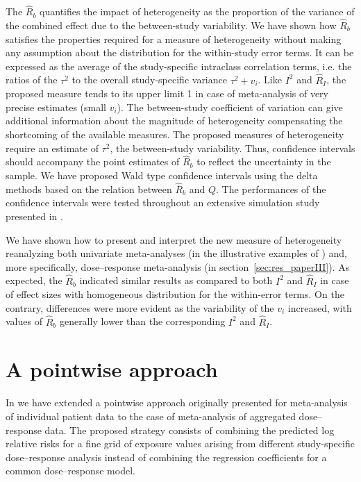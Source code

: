 \documentclass[11pt,a4paper,twoside,openany]{book}\usepackage{knitr}
\begin{document}
{The $\hat R_b$ quantifies the impact of heterogeneity as the proportion of the variance of the combined effect due to the between-study variability. We have shown how $\hat R_b$ satisfies the properties required for a measure of heterogeneity without making any assumption about the distribution for the within-study error terms. It can be expressed as the average of the study-specific intraclass correlation terms, i.e. the ratios of the $\tau^2$ to the overall study-specific variance $\tau^2 + v_i$. Like $I^2$ and $\hat R_I$, the proposed measure tends to its upper limit 1 in case of meta-analysis of very precise estimates (small $v_i$). The between-study coefficient of variation can give additional information about the magnitude of heterogeneity compensating the shortcoming of the available measures.
The proposed measures of heterogeneity require an estimate of $\tau^2$, the between-study variability. Thus, confidence intervals should accompany the point estimates of $\hat R_b$ to reflect the uncertainty in the sample. We have proposed Wald type confidence intervals using the delta methods based on the relation between $\hat R_b$ and $Q$. The performances of the confidence intervals were tested throughout an extensive simulation study presented in .

We have shown how to present and interpret the new measure of heterogeneity reanalyzing both univariate meta-analyses (in the illustrative examples of ) and, more specifically, dose--response meta-analysis (in section~\ref{sec:res_paperIII}). As expected, the $\hat R_b$ indicated similar results as compared to both $I^2$ and $\hat R_I$ in case of effect sizes with homogeneous distribution for the within-error terms. On the contrary, differences were more evident as the variability of the $v_i$ increased, with values of $\hat R_b$ generally lower than the corresponding $I^2$ and $\hat R_I$.


\section{A pointwise approach}

In  we have extended a pointwise approach originally presented for meta-analysis of individual patient data to the case of meta-analysis of aggregated dose--response data.  The proposed strategy consists of combining the predicted log relative risks for a fine grid of exposure values arising from different study-specific dose--response analysis instead of combining the regression coefficients for a common dose--response model.

}
\end{document}

